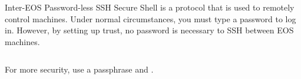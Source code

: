 \begin{block}{Inter-EOS Password-less SSH}
  Secure Shell is a protocol that is used to remotely control machines. Under normal circumstances, you must type a password to log in. However, by setting up trust, no password is necessary to SSH between EOS machines.
  \begin{indented}
    {\scriptsize \inputminted[tabsize=2,frame=single]{bash}{../common/ssh.bash}}
  \end{indented}
  For more security, use a passphrase and .
\end{block}
